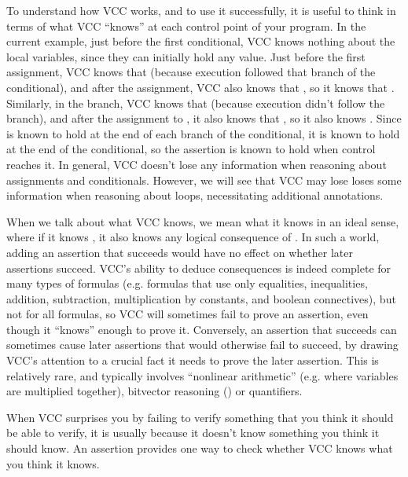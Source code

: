 To understand how VCC works, and to use it successfully, it is useful to
think in terms of what VCC ``knows'' at each control point
of your program. In the current example, just before the first conditional,
VCC  knows nothing about the local variables,
since they can initially hold any value. 
Just before the first assignment, VCC knows that 
 (because execution followed that branch of the conditional), and
after the assignment, VCC also knows that , 
so it knows that . Similarly, in the  branch,
VCC knows that  (because execution didn't follow the
 branch), and after the assignment to , it also knows
that , so it also knows . Since 
 is known to hold at the end of each branch of the
conditional, it is known to hold at the end of the conditional, so the
assertion is known to hold when control reaches it.
In general,
VCC doesn't lose any information when reasoning about assignments and
conditionals. However, we will see that VCC may lose
loses some information when reasoning about loops,
necessitating additional annotations.

When we talk about what VCC knows, we mean what it knows in an ideal
sense, where if it knows , it also knows any logical
consequence of . In such a world, adding an assertion that
succeeds would have no effect on whether later assertions succeed.
VCC's ability to deduce consequences is indeed complete for many types
of formulas (e.g. formulas that use only equalities,
inequalities, addition, subtraction, multiplication by constants, and
boolean connectives), but not for all formulas, so VCC will
sometimes fail to prove an assertion, even though it ``knows'' enough
to prove it.  Conversely, an assertion that succeeds can sometimes cause later assertions that
would otherwise fail to succeed, by drawing VCC's attention to a
crucial fact it needs to prove the later assertion.  This is
relatively rare, and typically involves ``nonlinear arithmetic''
(e.g. where variables are multiplied together), bitvector reasoning
() or quantifiers.

When VCC surprises you by failing to verify something that you think
it should be able to verify, it is usually because it doesn't know
something you think it should know. An assertion provides one way to
check whether VCC knows what you think it knows.



